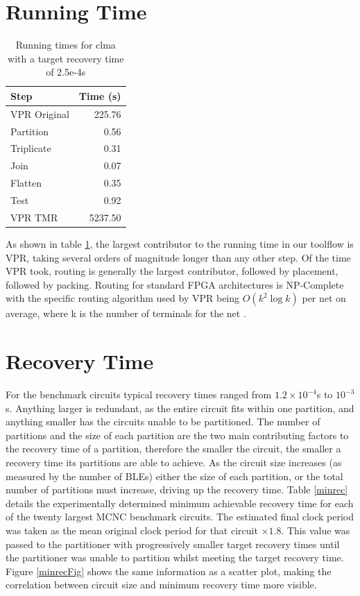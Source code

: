 \documentclass[12pt,final,oneside]{dwThesis} %
\begin{document}
   \section{Running Time}\label{timing}
   
   \begin{table}
   \begin{tabular}{lr}
	\toprule
   	Step & Time (s) \\
   	\midrule
   	VPR Original & 225.76\\
   	Partition & 0.56 \\
   	Triplicate & 0.31 \\
   	Join & 0.07 \\
   	Flatten & 0.35 \\
   	Test & 0.92 \\
   	VPR TMR & 5237.50\\
   	\bottomrule
   \end{tabular}
   \caption{Running times for clma with a target recovery time of 2.5e-4s}\label{runningtimes}
   \end{table}
   As shown in table \ref{runningtimes}, the largest contributor to the running time in our toolflow is \gls{VPR}, taking several orders of magnitude longer than any other step. Of the time \gls{VPR} took, routing is generally the largest contributor, followed by placement, followed by packing.
   Routing for standard \gls{FPGA} architectures is NP-Complete \cite{npcomplete} with the specific routing algorithm used by \gls{VPR} being $O(k^2\log{k})$ per net on average,
   where k is the number of terminals for the net \cite{VPRBook}.
   


   \section{Recovery Time}
    For the benchmark circuits typical recovery times ranged from $1.2\times10^{-4}$s to $10^{-3}$s. Anything larger is redundant, as the entire circuit fits within one partition, and anything smaller has the circuits unable to be partitioned. The number of partitions and the size of each partition are the two main contributing factors to the recovery time of a partition, therefore the smaller the circuit, the smaller a recovery time its partitions are able to achieve. As the circuit size increases (as measured by the number of \glspl{BLE}) either the size of each partition, or the total number of partitions must increase, driving up the recovery time.
    Table \ref{minrec} details the experimentally determined minimum achievable recovery time for each of the twenty largest \gls{MCNC} benchmark circuits. The estimated final clock period was taken as the mean original clock period for that circuit $\times 1.8$. This value was passed to the partitioner with progressively smaller target recovery times until the partitioner was unable to partition whilst meeting the target recovery time.
    Figure \ref{minrecFig} shows the same information as a scatter plot, making the correlation between circuit size and minimum recovery time more visible.
    
\end{document}
